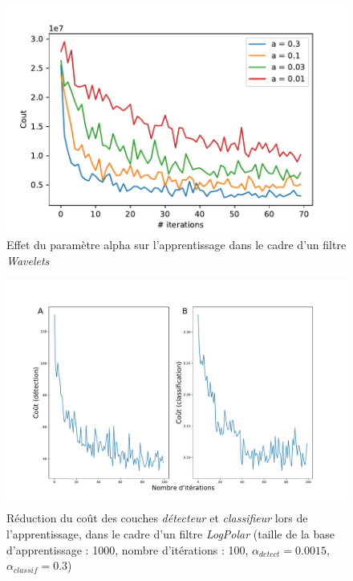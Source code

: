 \begin{figure}[th]
\centering
\includegraphics{Figures/Benchmarking_para_alpha}
\decoRule %
\caption[Figure]{Effet du paramètre alpha sur l'apprentissage dans le cadre d'un filtre \textit{Wavelets}}
\label{fig:benchmark_alpha}
\end{figure}

\begin{figure}[th]
\centering
\includegraphics[scale=0.4]{Figures/logpolar_cost_learning}
\decoRule %
\caption[Figure]{Réduction du coût des couches \textit{détecteur} et \textit{classifieur} lors de l'apprentissage, dans le cadre d'un filtre \textit{LogPolar} (taille de la base d'apprentissage :  1000, nombre d'itérations : 100, $\alpha_{detect}=0.0015$, $\alpha_{classif}=0.3$)}
\label{fig:logpolar_cost}
\end{figure}

